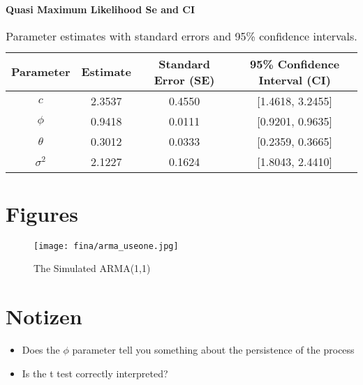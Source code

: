 \documentclass[12pt]{article}
\begin{document}
\textbf{Quasi Maximum Likelihood Se and CI}
\begin{table}[h!]
\centering
\begin{tabular}{|c|c|c|c|}
\hline
\textbf{Parameter} & \textbf{Estimate} & \textbf{Standard Error (SE)} & \textbf{95\% Confidence Interval (CI)} \\ \hline
$c$       & 2.3537 & 0.4550 & [1.4618, 3.2455] \\ \hline
$\phi$    & 0.9418 & 0.0111 & [0.9201, 0.9635] \\ \hline
$\theta$  & 0.3012 & 0.0333 & [0.2359, 0.3665] \\ \hline
$\sigma^2$ & 2.1227 & 0.1624 & [1.8043, 2.4410] \\ \hline
\end{tabular}
\caption{Parameter estimates with standard errors and 95\% confidence intervals.}
\label{tab:parameter_estimates_qml}
\end{table}





\newpage
\section{Figures}
 \begin{figure}[h!]
    \centering
    \texttt{[image: fina/arma\_useone.jpg]} 
    \caption{The Simulated ARMA(1,1)}
    \label{fig:armaone}
\end{figure}


\newpage
\section{Notizen}
\begin{itemize}
    \item Does the $\phi$ parameter tell you something about the persistence of the process
    \item Is the t test correctly interpreted?
\end{itemize}
\end{document}
